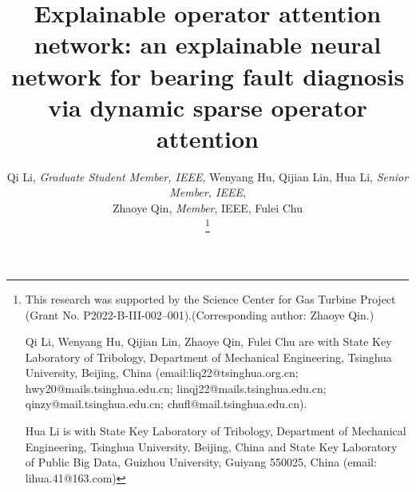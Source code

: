 \documentclass[lettersize,journal]{IEEEtran}
\begin{document}
\title{
Explainable operator attention network: an explainable neural network for bearing fault diagnosis via dynamic sparse operator attention
} 


\author{Qi Li, \textit{Graduate Student Member, IEEE}, Wenyang Hu, Qijian Lin, Hua Li, \textit{Senior Member, IEEE}, 

Zhaoye Qin, \textit{Member}, IEEE, Fulei Chu

\thanks{This research was supported by the Science Center for Gas Turbine Project (Grant No. P2022-B-III-002–001).(Corresponding author: Zhaoye Qin.)

Qi Li, Wenyang Hu, Qijian Lin, Zhaoye Qin, Fulei Chu are with State Key Laboratory of Tribology, Department of Mechanical Engineering, Tsinghua University, Beijing, China (email:liq22@tsinghua.org.cn;
hwy20@mails.tsinghua.edu.cn;
linqj22@mails.tsinghua.edu.cn;
qinzy@mail.tsinghua.edu.cn;
chufl@mail.tsinghua.edu.cn).

Hua Li is with State Key Laboratory of Tribology, Department of Mechanical Engineering, Tsinghua University, Beijing, China and State Key Laboratory of Public Big Data, Guizhou University, Guiyang 550025, China (email: lihua.41@163.com)}
}




\maketitle
\end{document}
